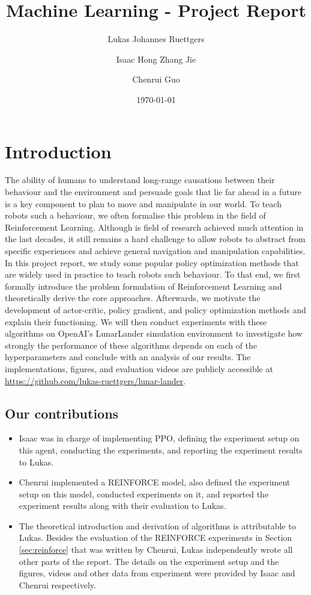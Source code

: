 \documentclass[a4paper, 11pt]{article}
\title{Machine Learning -  Project Report}
\author{Lukas Johannes Ruettgers \and Isaac Hong Zhang Jie \and Chenrui Guo}
\date{\today}
\begin{document}
	\maketitle
	\section{Introduction}
	The ability of humans to understand long-range causations between their behaviour and the environment and persuade goals that lie far ahead in a future is a key component to plan to move and manipulate in our world.
	To teach robots such a behaviour, we often formalise this problem in the field of Reinforcement Learning. Although is field of research achieved much attention in the last decades, it still remains a hard challenge to allow robots to abstract from specific experiences and achieve general navigation and manipulation capabilities. In this project report, we study some popular policy optimization methods that are widely used in practice to teach robots such behaviour.
	To that end, we first formally introduce the problem formulation of Reinforcement Learning and theoretically derive the core approaches. Afterwards, we motivate the development of actor-critic, policy gradient, and policy optimization methods and explain their functioning.
	We will then conduct experiments with these algorithms on OpenAI's LunarLander simulation environment to investigate how strongly the performance of these algorithms depends on each of the hyperparameters and conclude with an analysis of our results. The implementations, figures, and evaluation videos are publicly accessible at \url{https://github.com/lukas-ruettgers/lunar-lander}.
	\subsection{Our contributions}
	\begin{itemize}
		\item Isaac was in charge of implementing PPO, defining the experiment setup on this agent, conducting the experiments, and reporting the experiment results to Lukas.
		\item Chenrui implemented a REINFORCE model, also defined the experiment setup on this model, conducted experiments on it, and reported the experiment results along with their evaluation to Lukas.
		\item The theoretical introduction and derivation of algorithms is attributable to Lukas. Besides the evaluation of the REINFORCE experiments in Section \ref{sec:reinforce} that was written by Chenrui, Lukas independently wrote all other parts of the report.
		The details on the experiment setup and the figures, videos and other data from experiment were provided by Isaac and Chenrui respectively.
	\end{itemize}
\end{document}
